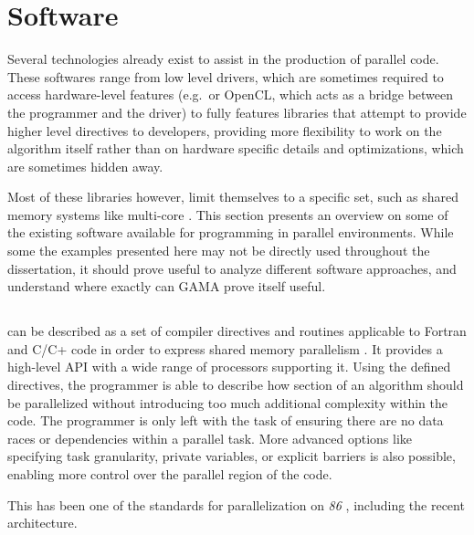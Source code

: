 \documentclass[main.tex]{subfiles}
\begin{document}
\section{Software}

Several technologies already exist to assist in the production of parallel code. These softwares range from low level drivers, which are sometimes required to access hardware-level features (e.g.\ \cuda or \acs{OpenCL}, which acts as a bridge between the programmer and the \gpu driver) to fully features libraries that attempt to provide higher level directives to developers, providing more flexibility to work on the algorithm itself rather than on hardware specific details and optimizations, which are sometimes hidden away.

Most of these libraries however, limit themselves to a specific set, such as shared memory systems like multi-core \cpus\xspace. This section presents an overview on some of the existing software available for programming in parallel environments. While some the examples presented here may not be directly used throughout the dissertation, it should prove useful to analyze different software approaches, and understand where exactly can \acs{GAMA} prove itself useful.


\subsection{\openmp}

\openmp can be described as a set of compiler directives and routines applicable to Fortran and C/C+ code in order to express shared memory parallelism \cite{dagum1998openmp}. It provides a high-level API with a wide range of processors supporting it.
Using the defined directives, the programmer is able to describe how section of an algorithm should be parallelized without introducing too much additional complexity within the code. The programmer is only left with the task of ensuring there are no data races or dependencies within a parallel task. More advanced options like specifying task granularity, private variables, or explicit barriers is also possible, enabling more control over the parallel region of the code.

This has been one of the standards for parallelization on \textit{86} \cpus, including the recent \intel \mic architecture.


\subsection{\cuda}
\end{document}
